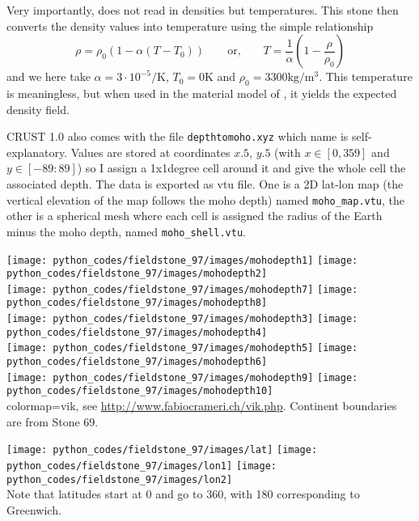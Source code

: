 Very importantly, \aspect{} does not read in densities but temperatures. This stone then 
converts the density values into temperature using the simple relationship
\[
\rho = \rho_0 (1-\alpha(T-T_0))
\qquad \text{or,} \qquad
T= \frac{1}{\alpha} \left(1 - \frac{\rho}{\rho_0} \right)
\]
and we here take $\alpha = 3\cdot 10^{-5}\si{\per\kelvin}$, 
$T_0=0\si{\kelvin}$ and $\rho_0=3300\si{\kilo\gram\per\cubic\metre}$. 
This temperature is meaningless, but when used in the material model of \aspect{}, 
it yields the expected density field. 

CRUST 1.0 also comes with the file {\tt depthtomoho.xyz} which name is 
self-explanatory. Values are stored at coordinates $x.5$, $y.5$ (with $x\in[0,359]$
and $y\in [-89:89]$) so I assign a 1x1degree cell around it and give the whole cell 
the associated depth.
The data is exported as vtu file. One is a 2D lat-lon map (the vertical 
elevation of the map follows the moho depth) named {\tt moho\_map.vtu}, the other is a 
spherical mesh where each cell is assigned the radius of the Earth minus the moho depth, 
named {\tt moho\_shell.vtu}.

\begin{center}
\texttt{[image: python\_codes/fieldstone\_97/images/mohodepth1]}
\texttt{[image: python\_codes/fieldstone\_97/images/mohodepth2]}\\
\texttt{[image: python\_codes/fieldstone\_97/images/mohodepth7]}
\texttt{[image: python\_codes/fieldstone\_97/images/mohodepth8]}\\
\texttt{[image: python\_codes/fieldstone\_97/images/mohodepth3]}
\texttt{[image: python\_codes/fieldstone\_97/images/mohodepth4]}\\
\texttt{[image: python\_codes/fieldstone\_97/images/mohodepth5]}
\texttt{[image: python\_codes/fieldstone\_97/images/mohodepth6]}\\
\texttt{[image: python\_codes/fieldstone\_97/images/mohodepth9]}
\texttt{[image: python\_codes/fieldstone\_97/images/mohodepth10]}\\
{\captionfont colormap=vik, see \url{http://www.fabiocrameri.ch/vik.php}.
Continent boundaries are from Stone 69.}
\end{center}

\begin{center}
\texttt{[image: python\_codes/fieldstone\_97/images/lat]}
\texttt{[image: python\_codes/fieldstone\_97/images/lon1]}
\texttt{[image: python\_codes/fieldstone\_97/images/lon2]}\\
{\captionfont Note that latitudes start at 0 and go to 360, with 180
corresponding to Greenwich.}
\end{center}



